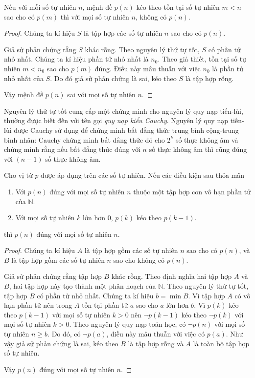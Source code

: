 \begin{theorem}
    Nếu với mỗi số tự nhiên $n$, mệnh đề $p(n)$ kéo theo tồn tại số tự nhiên $m < n$ sao cho có $p(m)$ thì với mọi số tự nhiên $n$, không có $p(n)$.
\end{theorem}

\begin{proof}
    Chúng ta kí hiệu $S$ là tập hợp các số tự nhiên $n$ sao cho có $p(n)$.

    Giả sử phản chứng rằng $S$ khác rỗng. Theo nguyên lý thứ tự tốt, $S$ có phần tử nhỏ nhất. Chúng ta kí hiệu phần tử nhỏ nhất là $n_{0}$. Theo giả thiết, tồn tại số tự nhiên $m < n_{0}$ sao cho $p(m)$ đúng. Điều này mâu thuẫn với việc $n_{0}$ là phần tử nhỏ nhất của $S$. Do đó giả sử phản chứng là sai, kéo theo $S$ là tập hợp rỗng.

    Vậy mệnh đề $p(n)$ sai với mọi số tự nhiên $n$.
\end{proof}

Nguyên lý thứ tự tốt cung cấp một chứng minh cho nguyên lý quy nạp tiến-lùi, thường được biết đến với tên gọi \textit{quy nạp kiểu Cauchy}. Nguyên lý quy nạp tiến-lùi được Cauchy sử dụng để chứng minh bất đẳng thức trung bình cộng-trung bình nhân: Cauchy chứng minh bất đẳng thức đó cho $2^{k}$ số thực không âm và chứng minh rằng nếu bất đẳng thức đúng với $n$ số thực không âm thì cũng đúng với $(n-1)$ số thực không âm.
\begin{theorem}
    Cho vị từ $p$ được áp dụng trên các số tự nhiên. Nếu các điều kiện sau thỏa mãn
    \begin{enumerate}[label={(\roman*)}]
        \item Với $p(n)$ đúng với mọi số tự nhiên $n$ thuộc một tập hợp con vô hạn phần tử của $\mathbb{N}$.
        \item Với mọi số tự nhiên $k$ lớn hơn $0$, $p(k)$ kéo theo $p(k-1)$.
    \end{enumerate}

    \noindent thì $p(n)$ đúng với mọi số tự nhiên $n$.
\end{theorem}

\begin{proof}
    Chúng ta kí hiệu $A$ là tập hợp gồm các số tự nhiên $n$ sao cho có $p(n)$, và $B$ là tập hợp gồm các số tự nhiên $n$ sao cho không có $p(n)$.

    Giả sử phản chứng rằng tập hợp $B$ khác rỗng. Theo định nghĩa hai tập hợp $A$ và $B$, hai tập hợp này tạo thành một phân hoạch của $\mathbb{N}$. Theo nguyên lý thứ tự tốt, tập hợp $B$ có phần tử nhỏ nhất. Chúng ta kí hiệu $b = \min B$. Vì tập hợp $A$ có vô hạn phần tử nên trong $A$ tồn tại phần tử $a$ sao cho $a$ lớn hơn $b$. Vì $p(k)$ kéo theo $p(k-1)$ với mọi số tự nhiên $k > 0$ nên $\neg p(k-1)$ kéo theo $\neg p(k)$ với mọi số tự nhiên $k > 0$. Theo nguyên lý quy nạp toán học, có $\neg p(n)$ với mọi số tự nhiên $n\geq b$. Do đó, có $\neg p(a)$, điều này mâu thuẫn với việc có $p(a)$. Như vậy giả sử phản chứng là sai, kéo theo $B$ là tập hợp rỗng và $A$ là toàn bộ tập hợp số tự nhiên.

    Vậy $p(n)$ đúng với mọi số tự nhiên $n$.
\end{proof}

